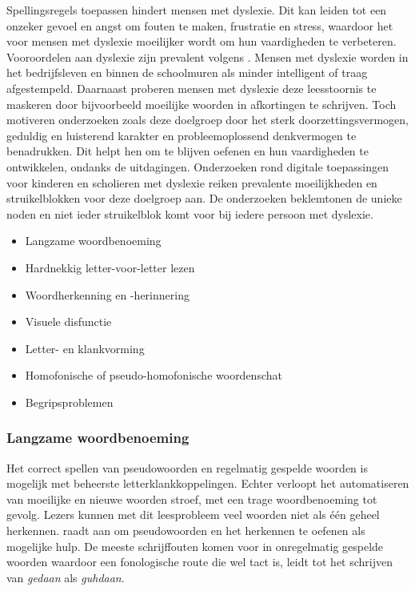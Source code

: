 Spellingsregels toepassen hindert mensen met dyslexie. Dit kan leiden tot een onzeker gevoel en angst om fouten te maken, frustratie en stress, waardoor het voor mensen met dyslexie moeilijker wordt om hun vaardigheden te verbeteren. Vooroordelen aan dyslexie zijn prevalent volgens \textcite{Diels2022}. Mensen met dyslexie worden in het bedrijfsleven en binnen de schoolmuren als minder intelligent of traag afgestempeld. Daarnaast proberen mensen met dyslexie deze leesstoornis te maskeren door bijvoorbeeld moeilijke woorden in afkortingen te schrijven. Toch motiveren onderzoeken zoals \textcite{Ghesquiere2018, Lissens2020, Bonte2020} deze doelgroep door het sterk doorzettingsvermogen, geduldig en luisterend karakter en probleemoplossend denkvermogen te benadrukken. Dit helpt hen om te blijven oefenen en hun vaardigheden te ontwikkelen, ondanks de uitdagingen. Onderzoeken rond digitale toepassingen voor kinderen en scholieren met dyslexie reiken prevalente moeilijkheden en struikelblokken voor deze doelgroep aan. De onderzoeken beklemtonen de unieke noden en niet ieder struikelblok komt voor bij iedere persoon met dyslexie.

\begin{itemize}
	\item Langzame woordbenoeming
	\item Hardnekkig letter-voor-letter lezen
	\item Woordherkenning en -herinnering
	\item Visuele disfunctie
	\item Letter- en klankvorming
	\item Homofonische of pseudo-homofonische woordenschat
	\item Begripsproblemen
\end{itemize}

\subsubsection{Langzame woordbenoeming}

Het correct spellen van pseudowoorden en regelmatig gespelde woorden is mogelijk met beheerste letterklankkoppelingen. Echter verloopt het automatiseren van moeilijke en nieuwe woorden stroef, met een trage woordbenoeming tot gevolg. Lezers kunnen met dit leesprobleem veel woorden niet als één geheel herkennen. \textcite{Filipak2020} raadt aan om pseudowoorden en het herkennen te oefenen als mogelijke hulp. De meeste schrijffouten komen voor in onregelmatig gespelde woorden waardoor een fonologische route die wel tact is, leidt tot het schrijven van \textit{gedaan} als \textit{guhdaan}.

